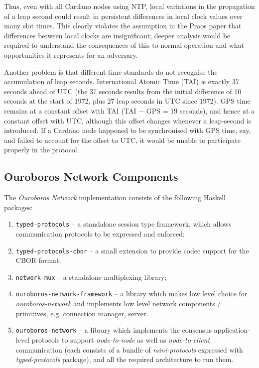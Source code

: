 \documentclass[11pt,a4paper]{article}
\begin{document}
Thus, even with all Cardano nodes using NTP, local variations in the
propagation of a leap second could result in persistent differences in
local clock values over many slot times. This clearly violates the
assumption in the Praos paper that differences between local clocks are
insignificant; deeper analysis would be required to understand the
consequences of this to normal operation and what opportunities it
represents for an adversary.

Another problem is that different time standards do not recognise the
accumulation of leap seconds. International Atomic Time (TAI) is exactly
37 seconds ahead of UTC (the 37 seconds results from the initial
difference of 10 seconds at the start of 1972, plus 27 leap seconds in
UTC since 1972). GPS time remains at a constant offset with TAI (TAI $-$
GPS = 19 seconds), and hence at a constant offset with UTC, although
this offset changes whenever a leap-second is introduced. If a Cardano
node happened to be synchronised with GPS time, say, and failed to
account for the offset to UTC, it would be unable to participate
properly in the protocol.

\subsection{Ouroboros Network Components}
\label{ouroboros-network-components}

The \emph{Ouroboros Network} implementation consists of the following
Haskell packages:

\begin{enumerate}
\item
  \texttt{typed-protocols} -- a standalone session type framework, which
  allows communication protocols to be expressed and enforced;
\item
  \texttt{typed-protocols-cbor} -- a small extension to provide codec
  support for the CBOR format;
\item
  \texttt{network-mux} -- a standalone multiplexing library;
\item
  \texttt{ouroboros-network-framework} -- a library which makes low
  level choice for \emph{ouroboros-network} and implements low level
  network components / primitives, e.g. connection manager, server.
\item
  \texttt{ouroboros-network} -- a library which implements the consensus
  application-level protocols to support \emph{node-to-node} as well as
  \emph{node-to-client} communication (each consists of a bundle of
  \emph{mini-protocols} expressed with \emph{typed-protocols} package),
  and all the required architecture to run them.
\end{enumerate}
\end{document}
